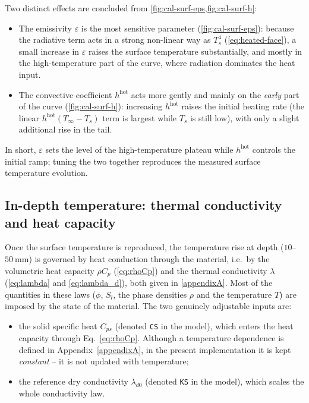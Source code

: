 Two distinct effects are concluded from \cref{fig:cal-surf-eps,fig:cal-surf-h}: 
\begin{itemize}
  \item The emissivity $\varepsilon$ is the most sensitive parameter (\cref{fig:cal-surf-eps}): because the radiative term acts in a strong non-linear way as $T_s^4$ (\cref{eq:heated-face}), a small increase in $\varepsilon$ raises the surface temperature substantially, and mostly in the high-temperature part of the curve, where radiation dominates the heat input.

  \item The convective coefficient $h^{\mathrm{hot}}$ acts more gently and mainly on the \emph{early} part of the curve (\cref{fig:cal-surf-h}): increasing $h^{\mathrm{hot}}$ raises the initial heating rate (the linear $h^{\mathrm{hot}}(T_\infty - T_s)$ term is largest while $T_s$ is still low), with only a slight additional rise in the tail. 
\end{itemize}

In short, $\varepsilon$ sets the level of the high-temperature plateau while $h^{\mathrm{hot}}$ controls the initial ramp; tuning the two together reproduces the measured surface temperature evolution.
 
\subsection{In-depth temperature: thermal conductivity and heat capacity} \label{sec:cal-depth}
 
Once the surface temperature is reproduced, the temperature rise at depth ($10$--$50~\mathrm{mm}$) is governed by heat conduction through the material, i.e.\ by the volumetric heat capacity $\rho C_p$ (\cref{eq:rhoCp}) and the thermal conductivity $\lambda$ (\cref{eq:lambda} and \cref{eq:lambda_d}), both given in \cref{appendixA}. Most of the quantities in these laws ($\phi$, $S_l$, the phase densities $\rho$ and the temperature $T$) are imposed by the state of the material. The two genuinely adjustable inputs are:
\begin{itemize}
  \item the solid specific heat $C_{ps}$ (denoted \texttt{CS} in the model), which enters the heat capacity through Eq.~\ref{eq:rhoCp}. Although a temperature dependence is defined in Appendix~\ref{appendixA}, in the present implementation it is kept \emph{constant} -- it is not updated with temperature;
  \item the reference dry conductivity $\lambda_{d0}$ (denoted \texttt{KS} in the model), which scales the whole conductivity law.
\end{itemize}
 
